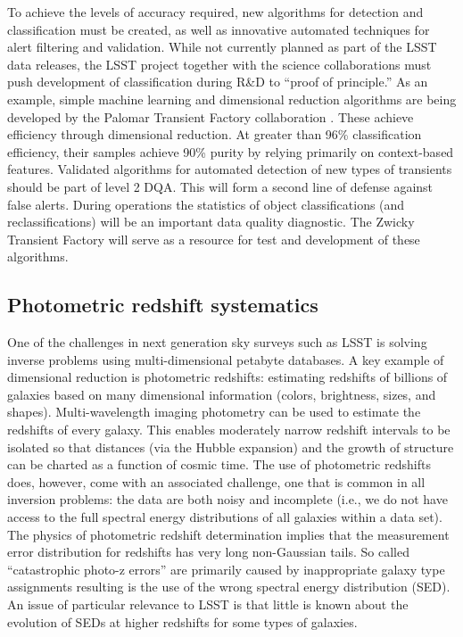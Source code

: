 \documentclass[SE,toc,lsstdraft]{lsstdoc}
\begin{document}
To achieve the levels of accuracy required, new algorithms for detection and classification must be created, as well as innovative automated techniques for alert filtering and validation.  While not currently planned as part of the LSST data releases, the LSST project together with the science collaborations must push development of classification during R\&D to ``proof of principle.''  As an example, simple machine learning and dimensional reduction algorithms are being developed by the Palomar Transient Factory collaboration \citep{2012PASP..124.1175B}.  These achieve efficiency through dimensional reduction. At greater than 96\% classification efficiency, their samples achieve 90\% purity by relying primarily on context-based features. Validated algorithms for automated detection of new types of transients should be part of level 2 DQA. This will form a second line of defense against false alerts. During operations the statistics of object classifications (and reclassifications) will be an important data quality diagnostic.
The Zwicky Transient Factory will serve as a resource for test and development of these algorithms.

\subsection{Photometric redshift systematics}

One of the challenges in next generation sky surveys such as LSST is solving inverse problems using multi-dimensional petabyte databases. A key example of dimensional reduction is photometric redshifts: estimating redshifts of billions of galaxies based on many dimensional information (colors, brightness, sizes, and shapes). Multi-wavelength imaging photometry can be used to estimate the redshifts of every galaxy.  This enables moderately narrow redshift intervals to be isolated so that distances (via the Hubble expansion) and the growth of structure can be charted as a function of cosmic time.  The use of photometric redshifts does, however, come with an associated challenge, one that is common in all inversion problems: the data are both noisy and incomplete (i.e., we do not have access to the full spectral energy distributions of all galaxies within a data set). The physics of photometric redshift determination implies that the measurement error distribution for redshifts has very long non-Gaussian tails. So called ``catastrophic photo-z errors'' are primarily caused by inappropriate galaxy type assignments resulting is the use of the wrong spectral energy distribution (SED). An issue of particular relevance to LSST is that little is known about the evolution of SEDs at higher redshifts for some types of galaxies.
\end{document}
